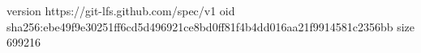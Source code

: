 version https://git-lfs.github.com/spec/v1
oid sha256:ebe49f9e30251ff6cd5d496921ce8bd0ff81f4b4dd016aa21f9914581c2356bb
size 699216
